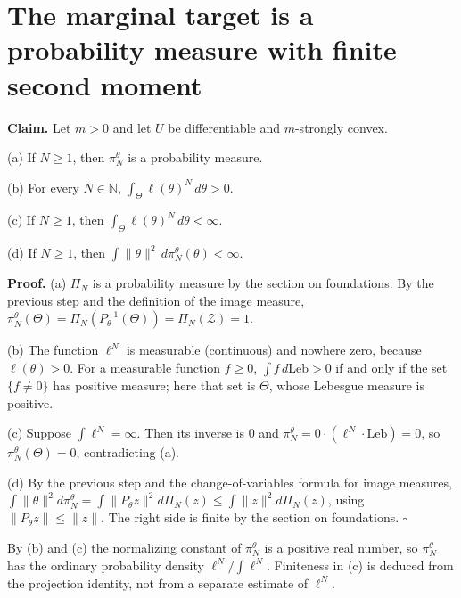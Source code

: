 \documentclass[11pt,a4paper]{article}
\begin{document}
\section{\texorpdfstring{The marginal target is a probability measure with finite second moment}{The marginal target is a probability measure with finite second moment}}


\textbf{Claim.} Let \(m>0\) and let \(U\) be differentiable and \(m\)-strongly convex.




(a) If \(N\ge1\), then \(\pi_N^\theta\) is a probability measure.




(b) For every \(N\in\mathbb N\), \(\int_\Theta\ell(\theta)^N\,d\theta>0\).




(c) If \(N\ge1\), then \(\int_\Theta\ell(\theta)^N\,d\theta<\infty\).




(d) If \(N\ge1\), then \(\int\|\theta\|^2\,d\pi_N^\theta(\theta)<\infty\).




\textbf{Proof.} (a) \(\Pi_N\) is a probability measure by the section on foundations. By the previous step and the definition of the image measure, \(\pi_N^\theta(\Theta)=\Pi_N(P_\theta^{-1}(\Theta))=\Pi_N(\mathcal Z)=1\).




(b) The function \(\ell^N\) is measurable (continuous) and nowhere zero, because \(\ell(\theta)>0\). For a measurable function \(f\ge0\), \(\int f\,d\mathrm{Leb}>0\) if and only if the set \(\{f\ne0\}\) has positive measure; here that set is \(\Theta\), whose Lebesgue measure is positive.




(c) Suppose \(\int\ell^N=\infty\). Then its inverse is \(0\) and \(\pi_N^\theta=0\cdot(\ell^N\cdot\mathrm{Leb})=0\), so \(\pi_N^\theta(\Theta)=0\), contradicting (a).




(d) By the previous step and the change-of-variables formula for image measures, \(\int\|\theta\|^2d\pi_N^\theta=\int\|P_\theta z\|^2d\Pi_N(z)\le\int\|z\|^2d\Pi_N(z)\), using \(\|P_\theta z\|\le\|z\|\). The right side is finite by the section on foundations. \(\square\)




By (b) and (c) the normalizing constant of \(\pi_N^\theta\) is a positive real number, so \(\pi_N^\theta\) has the ordinary probability density \(\ell^N/\int\ell^N\). Finiteness in (c) is deduced from the projection identity, not from a separate estimate of \(\ell^N\).
\end{document}
